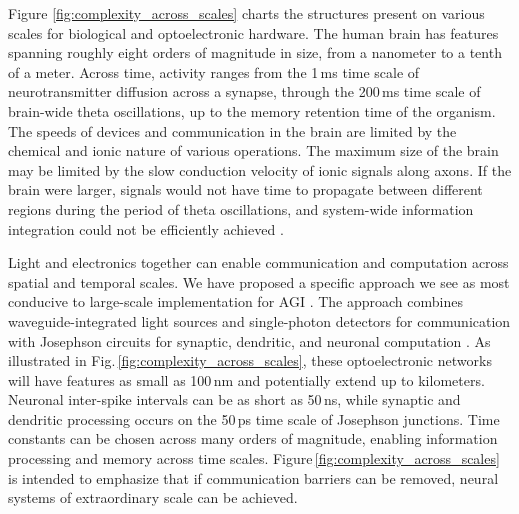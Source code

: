 \documentclass[twocolumn]{article}
\begin{document}
Figure \ref{fig:complexity_across_scales} charts the structures present on various scales for biological and optoelectronic hardware. The human brain has features spanning roughly eight orders of magnitude in size, from a nanometer to a tenth of a meter. Across time, activity ranges from the 1\,ms time scale of neurotransmitter diffusion across a synapse, through the 200\,ms time scale of brain-wide theta oscillations, up to the memory retention time of the organism. The speeds of devices and communication in the brain are limited by the chemical and ionic nature of various operations. The maximum size of the brain may be limited by the slow conduction velocity of ionic signals along axons. If the brain were larger, signals would not have time to propagate between different regions during the period of theta oscillations, and system-wide information integration could not be efficiently achieved \cite{bu2006,sh2019}.

Light and electronics together can enable communication and computation across spatial and temporal scales. We have proposed a specific approach we see as most conducive to large-scale implementation for AGI \cite{shbu2017,sh2018,sh2019,sh2020}. The approach combines waveguide-integrated light sources and single-photon detectors for communication \cite{shbu2017,buch2017} with Josephson circuits for synaptic, dendritic, and neuronal computation \cite{sh2018,sh2020}. As illustrated in Fig.\,\ref{fig:complexity_across_scales}, these optoelectronic networks will have features as small as 100\,nm and potentially extend up to kilometers. Neuronal inter-spike intervals can be as short as 50\,ns, while synaptic and dendritic processing occurs on the 50\,ps time scale of Josephson junctions. Time constants can be chosen across many orders of magnitude, enabling information processing and memory across time scales. Figure\,\ref{fig:complexity_across_scales} is intended to emphasize that if communication barriers can be removed, neural systems of extraordinary scale can be achieved.
\end{document}
